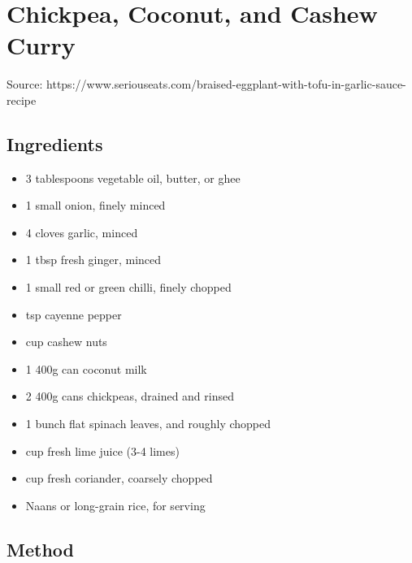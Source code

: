 \section{Chickpea, Coconut, and Cashew Curry}


Source: https://www.seriouseats.com/braised-eggplant-with-tofu-in-garlic-sauce-recipe

\subsection{Ingredients}

\begin{itemize}
    \item 3 tablespoons vegetable oil, butter, or ghee
    \item 1 small onion, finely minced
    \item 4 cloves garlic, minced
    \item 1 tbsp fresh ginger, minced
    \item 1 small red or green chilli, finely chopped
    \item {} tsp cayenne pepper
    \item {} cup cashew nuts
    \item 1 400g can coconut milk
    \item 2 400g cans chickpeas, drained and rinsed
    \item 1 bunch flat spinach leaves, and roughly chopped
    \item {} cup fresh lime juice (3-4 limes)
    \item {} cup fresh coriander, coarsely chopped
    \item Naans or long-grain rice, for serving
\end{itemize}

\subsection{Method}

